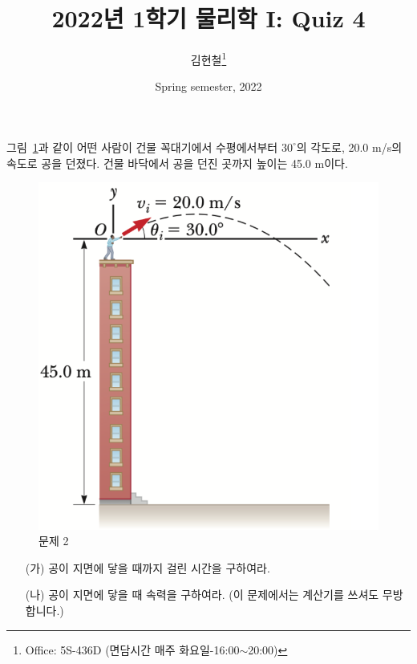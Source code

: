 \documentclass[floatfix,nofootinbib,superscriptaddress,fleqn,preprint]{revtex4-2}
\begin{document}
\title{\Large 2022년 1학기 물리학 I: Quiz 4}
\author{김현철\footnote{Office: 5S-436D (면담시간 매주
    화요일-16:00$\sim$20:00)}} 
\date{Spring semester, 2022}
\maketitle

그림~\ref{fig:1}과 같이 어떤 사람이 건물
꼭대기에서 수평에서부터 $30^\circ$의 각도로, 20.0 m/s의 속도로
공을 던졌다. 건물 
바닥에서 공을 던진 곳까지 높이는 45.0 m이다. 
\begin{figure}[ht]
  \centering
\includegraphics[scale=0.6]{Qfig4-2.pdf}  
  \caption{문제 2}
  \label{fig:1}
\end{figure}
\begin{itemize}
\item[(가)] 공이 지면에 닿을 때까지 걸린 시간을 구하여라.
\item[(나)] 공이 지면에 닿을 때 속력을 구하여라. (이 문제에서는 계산기를
  쓰셔도 무방합니다.)
\end{itemize}
\vspace{0.2cm}
\end{document}
